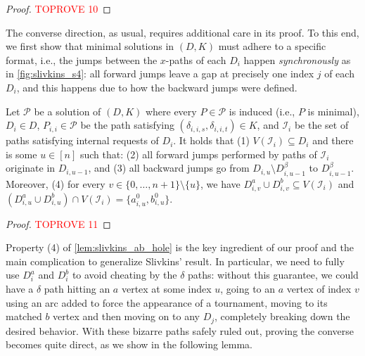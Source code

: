 \documentclass[a4paper,UKenglish,cleveref, autoref, thm-restate]{lipics-v2021}
\begin{document}
    \begin{proof}\textcolor{red}{TOPROVE 10}\end{proof}

    The converse direction, as usual, requires additional care in its proof. To this end,
    we first show that minimal solutions in $(D,K)$ must adhere to a specific format, i.e., the
    jumps between the $x$-paths of each $D_i$ happen \textit{synchronously} as in
    \autoref{fig:slivkins_s4}: all forward jumps leave a gap at precisely one index
    $j$ of each $D_i$, and this happens due to how the backward jumps were defined.

    \begin{lemma}
      \label{lem:slivkins_ab_hole}
      Let $\mathcal{P}$ be a solution of $(D, K)$ where every $P \in \mathcal{P}$ is
      induced (i.e., $P$ is minimal), $D_{i} \in D$, $P_{i,i}
      \in \mathcal{P}$ be the path satisfying $(\delta_{i,i,s}, \delta_{i,i,t}) \in K$,
      and $\mathcal{I}_i$ be the set of paths satisfying internal requests of $D_i$.
      It holds that (1) $V(\mathcal{I}_i) \subseteq D_i$ and there is some $u \in [n]$
      such that: (2) all forward jumps performed by paths
      of $\mathcal{I}_i$ originate in $D_{i, u-1}$, and (3) all backward jumps go from
      $D_{i,u} \setminus D^\beta_{i,u-1}$ to $D^\beta_{i,u-1}$.
      Moreover, (4) for every $v \in \{0, \dots, n+1\} \setminus \{u\}$, we have
      $D^a_{i,v} \cup D^b_{i,v} \subseteq V(\mathcal{I}_i)$ and $(D^a_{i,u} \cup
      D^b_{i,u}) \cap V(\mathcal{I}_i) = \{a^0_{i,u}, b^0_{i,u}\}$.
    \end{lemma}

    \begin{proof}\textcolor{red}{TOPROVE 11}\end{proof}

    Property (4) of \autoref{lem:slivkins_ab_hole} is the key ingredient of our proof
    and the main complication to generalize Slivkins' result. In particular, we need to
    fully use $D^a_i$ and $D^b_i$ to avoid cheating by the $\delta$ paths: without this
    guarantee, we could have a $\delta$ path hitting an $a$ vertex at some index $u$,
    going to an $a$ vertex of index $v$ using an arc added to force the appearance of a
    tournament, moving to its matched $b$ vertex and then moving on to any $D_j$,
    completely breaking down the desired behavior.
    With these bizarre paths safely ruled out, proving the converse becomes quite direct,
    as we show in the following lemma.
\end{document}
